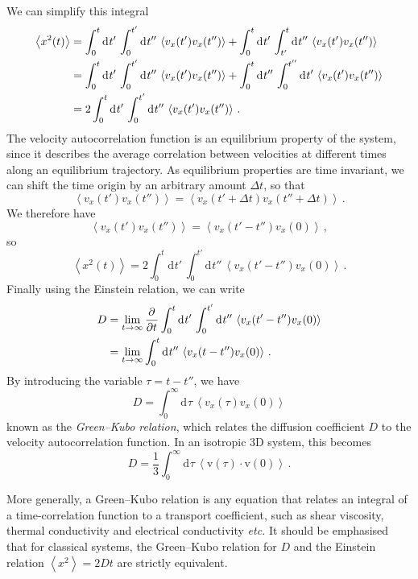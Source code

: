 \documentclass{article}
\theoremstyle{plain}\theoremheaderfont{\normalfont\bfseries}\theorembodyfont{\rmfamily}\theoremseparator{.}\newtheorem*{thm}{Theorem}\newtheorem*{law}{Law}\newtheorem*{pos}{Postulate}
\numberwithin{equation}{section}
\newcommand{\dd}[2][]{\mathrm{d}^{#1} #2\,}
\newcommand{\pdv}[3][]{\frac{\partial^{#1} #2}{{\partial #3}^{#1}}}
\newcommand{\eval}[1]{\left\langle #1 \right\rangle}
\newcommand{\vb}[1]{\bm{\mathrm{#1}}}
\newcommand{\vdot}{\,\bm{\mathrm{\cdot}}\,}
\begin{document}
    We can simplify this integral
    \begin{align}
        \eval{x^2(t)}&=\int_{0}^{t}\dd{t'}\int_{0}^{t'}\dd{t''}\eval{v_x(t')v_x(t'')}+\int_{0}^{t}\dd{t'}\int_{t'}^{t}\dd{t''}\eval{v_x(t')v_x(t'')}\notag \\
        &=\int_{0}^{t}\dd{t'}\int_{0}^{t'}\dd{t''}\eval{v_x(t')v_x(t'')}+\int_{0}^{t}\dd{t''}\int_{0}^{t''}\dd{t'}\eval{v_x(t')v_x(t'')}\notag \\
        &=2\int_{0}^{t}\dd{t'}\int_{0}^{t'}\dd{t''}\eval{v_x(t')v_x(t'')}\,.
    \end{align}
    The velocity autocorrelation function is an equilibrium property of the system, since it describes the average correlation between velocities at different times along an equilibrium trajectory. As equilibrium properties are time invariant, we can shift the time origin by an arbitrary amount \(\Delta t\), so that
    \begin{equation}
        \eval{v_x(t')v_x(t'')}=\eval{v_x(t'+\Delta t)v_x(t''+\Delta t)}\,.
    \end{equation}
    We therefore have
    \begin{equation}
        \eval{v_x(t')v_x(t'')}=\eval{v_x(t'-t'')v_x(0)}\,,
    \end{equation}
    so
    \begin{equation}
        \eval{x^2(t)}=2\int_{0}^{t}\dd{t'}\int_{0}^{t'}\dd{t''}\eval{v_x(t'-t'')v_x(0)}\,.
    \end{equation}
    Finally using the Einstein relation, we can write
    \begin{align}
        D&=\lim_{t\to\infty}\pdv{}{t}\int_{0}^{t}\dd{t'}\int_{0}^{t'}\dd{t''}\eval{v_x(t'-t'')v_x(0)}\notag\\
        &=\lim_{t\to\infty}\int_{0}^{t}\dd{t''}\eval{v_x(t-t'')v_x(0)}\,.
    \end{align}
    By introducing the variable \(\tau=t-t''\), we have
    \begin{equation}
        D=\int_{0}^{\infty}\dd{\tau}\eval{v_x(\tau)v_x(0)}
    \end{equation}
    known as the \textit{Green--Kubo relation}, which relates the diffusion coefficient \(D\) to the velocity autocorrelation function. In an isotropic 3D system, this becomes
    \begin{equation}
        D=\frac{1}{3}\int_{0}^{\infty}\dd{\tau}\eval{\vb{v}(\tau)\vdot\vb{v}(0)}\,.
    \end{equation}
    
    More generally, a Green--Kubo relation is any equation that relates an integral of a time-correlation function to a transport coefficient, such as shear viscosity, thermal conductivity and electrical conductivity \textit{etc.} It should be emphasised that for classical systems, the Green--Kubo relation for \(D\) and the Einstein relation \(\eval{x^2}=2Dt\) are strictly equivalent.
\end{document}
